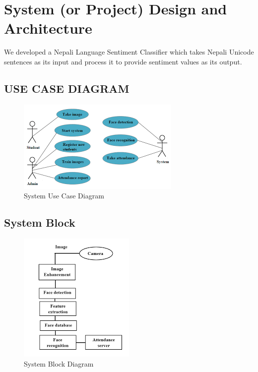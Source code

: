 	\chapter{System (or Project) Design and Architecture}
	    We developed a Nepali Language Sentiment Classifier which takes Nepali Unicode
sentences as its input and process it to provide sentiment values as its output.
        \section{USE CASE DIAGRAM}
          \begin{figure}[hbt!]
		    \centering
		      \includegraphics[width=.75\textwidth]{Images/UseCase.png}
			    \caption{System Use Case Diagram}
		\end{figure}
        \section{System Block}
        	\begin{figure}[ht]
		    \centering
			    \includegraphics[width=.75\textwidth]{Images/BlockDiagram.png}
			    \caption{System Block Diagram}
		\end{figure}
        \\
